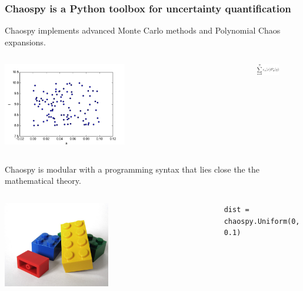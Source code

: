 \documentclass[handout]{beamer}
\begin{document}
 \begin{frame}
 \frametitle{Chaospy is a Python toolbox for uncertainty quantification}

 Chaospy implements advanced Monte Carlo methods and Polynomial Chaos expansions.

 \begin{columns}
      \begin{center}
                 \includegraphics[width=0.5\textwidth]{samples.png}
      \end{center}
      \begin{center}
                   \includegraphics[width=0.5\textwidth]{pc.png}
      \end{center}
  \end{columns}

  \vspace{5mm}
\pause
Chaospy is modular with a programming syntax that lies close the the mathematical theory.

\begin{columns}
     \begin{center}
                \includegraphics[width=0.5\textwidth]{lego.jpg}
     \end{center}
     \begin{center}

  \lstinline|dist = chaospy.Uniform(0, 0.1)|

    \end{center}

 \end{columns}

 \end{frame}
\end{document}
